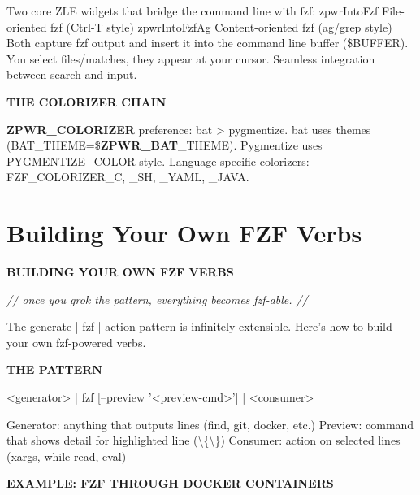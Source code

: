 \documentclass[11pt,a4paper,twoside]{book}
\begin{document}
Two core ZLE widgets that bridge the command line with fzf: zpwrIntoFzf     File-oriented fzf (Ctrl-T style) zpwrIntoFzfAg   Content-oriented fzf (ag/grep style) Both capture fzf output and insert it into the command line buffer (\$BUFFER). You select files/matches, they appear at your cursor. Seamless integration between search and input.


\vspace{12pt}
{\bfseries\color{neonyellow} THE COLORIZER CHAIN}\vspace{4pt}

\textbf{ZPWR\_COLORIZER} preference: bat > pygmentize. bat uses themes (BAT\_THEME=\$\textbf{ZPWR\_BAT}\_THEME). Pygmentize uses PYGMENTIZE\_COLOR style. Language-specific colorizers: FZF\_COLORIZER\_C, \_SH, \_YAML, \_JAVA.


\vspace{16pt}

\section{Building Your Own FZF Verbs}


\vspace{10pt}
{\large\bfseries\color{neoncyan} BUILDING YOUR OWN FZF VERBS}\vspace{6pt}

{\small\itshape\color{dimtext} // once you grok the pattern, everything becomes fzf-able. //}

The generate | fzf | action pattern is infinitely extensible. Here's how to build your own fzf-powered verbs.


\vspace{12pt}
{\bfseries\color{neonyellow} THE PATTERN}\vspace{4pt}

\begin{codebox}
\color{neongreen}<generator> | fzf [--preview '<preview-cmd>'] | <consumer>\\
\end{codebox}

Generator: anything that outputs lines (find, git, docker, etc.) Preview: command that shows detail for highlighted line (\textbackslash{}\{\textbackslash{}\}) Consumer: action on selected lines (xargs, while read, eval)


\vspace{12pt}
{\bfseries\color{neonyellow} EXAMPLE: FZF THROUGH DOCKER CONTAINERS}\vspace{4pt}
\end{document}
